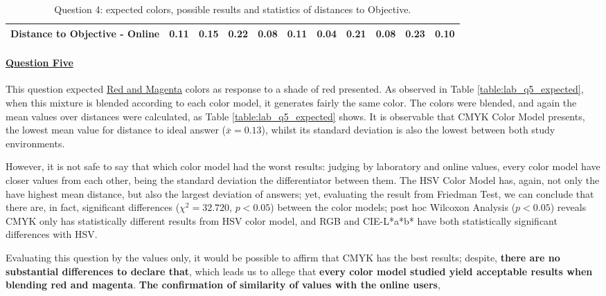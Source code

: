 \begin{table}[H]
{\begin{tabular}{lccccccccccccc}
    \multicolumn{4}{l}{Distance to Objective - Online}                                                                                               & \multicolumn{1}{|c}{0.11}       & \multicolumn{1}{c|}{0.15}    & \multicolumn{1}{|c}{0.22}       & \multicolumn{1}{c|}{0.08}    & \multicolumn{1}{|c}{\textbf{0.11}}         & \multicolumn{1}{c|}{0.04}    & \multicolumn{1}{|c}{0.21}        & \multicolumn{1}{c|}{0.08}    & \multicolumn{1}{|c}{0.23}       & \multicolumn{1}{c|}{0.10}    \\ \hline
    \end{tabular}}
  \caption[Question 4, with expected Results.]{Question 4: expected colors, possible results and statistics of distances to Objective.}
  \label{table:lab_q4_expected}
\end{table}
%
\paragraph{\ul{Question Five}}
%
This question expected \ul{Red and Magenta} colors as response to a shade of red presented. As observed in Table \ref{table:lab_q5_expected}, when this mixture is blended according
to each color model, it generates fairly the same color. The colors were blended, and again the mean values over distances were calculated, as Table \ref{table:lab_q5_expected} shows.
It is observable that CMYK Color Model presents, the lowest mean value for distance to ideal answer ($\overline{x} = 0.13$), whilst its standard deviation is also the lowest between both study environments. \par
%
However, it is not safe to say that which color model had the worst results: judging by laboratory and online values, every color model have closer values from each other, being the
standard deviation the differentiator between them. The HSV Color Model has, again, not only the have highest mean distance, but also the largest deviation of answers; yet, evaluating
the result from Friedman Test, we can conclude that there are, in fact, significant differences ($\chi^2 = 32.720$, $p < 0.05$) between the color models; post hoc Wilcoxon Analysis
($p < 0.05$) reveals CMYK only has statistically different results from HSV color model, and RGB and CIE-L*a*b* have both statistically significant differences with HSV. \par
%
Evaluating this question by the values only, it would be possible to affirm that CMYK has the best results; despite, \textbf{there are no substantial differences to declare that}, which
leads us to allege that \textbf{every color model studied yield acceptable results when blending red and magenta}. \textbf{The confirmation of similarity of values with the online users},
